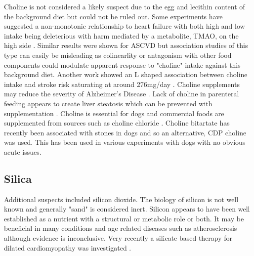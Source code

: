  Choline is not considered
a likely suspect due to the egg and lecithin content of the background
diet but could not be ruled out. 
Some experiments have suggested a non-monotonic relationship
to heart failure with both high and low intake being deleterious
with  harm mediated by a metabolite, TMAO, on the high side \cite{PMC7793226}.
Similar results were shown for ASCVD
\cite{Lin_Zhong_Zhang_inverse_association_2024} but
association studies of this type can easily be misleading as
colinearlity or antagonism with other food components could 
modulate apparent response to "choline" intake against this background
diet. 
Another work showed an L shaped association between choline intake
and stroke risk saturating at around 276mg/day
\cite{Wang_Lin_Fan_Choline_consumption_reduces_2024}.
Choline supplements may reduce the severity of Alzheimer's Disease
\cite{PMC6826123}.
Lack of choline in parenteral feeding appears to create liver
steatosis which can be prevented with supplementation 
\cite{Sheard_Tayek_Bistrian_Plasma_choline_concentration_1986}.
Choline is essential for dogs and commercial foods are supplemented
from sources such as choline chloride \cite{PMC9558542}.
Choline bitartate has recently been associated with stones in dogs
\cite{PMC12035869}
and so an alternative, CDP choline was used.
This has been used in various experiments with dogs
\cite{PMC9151482} \cite{PMID34715589} with 
no obvious acute issues. 


\subsection{Silica }

Additional suspects included silicon dioxide. The biology of silicon
is not well known and generally "sand" is considered inert.
Silicon appears to have been well established as a nutrient
with a structural or metabolic role or both.
It may be  beneficial in many conditions 
\cite{Carlisle_Silicon_Essential_2007}
\cite{Martin2013}
\cite{CARLISLE198895}
and  age related diseases such as atherosclerosis 
\cite{vv321ukaszDudek_vv322awKochman_Dziedzic_Silicon_prevention_2024}
although  evidence is inconclusive. 
Very recently a silicate based therapy for dilated cardiomyopathy
was investigated 
\cite{Sun_Zhang_Gao_Silicate_based_therapy_2025}.

